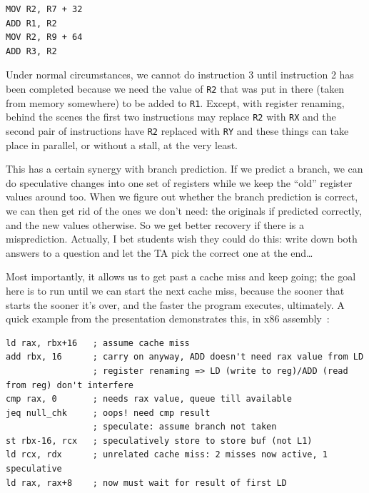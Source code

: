 \documentclass[a4paper]{report}
\begin{document}
\begin{verbatim}
MOV R2, R7 + 32
ADD R1, R2
MOV R2, R9 + 64
ADD R3, R2
\end{verbatim}

Under normal circumstances, we cannot do instruction 3 until instruction 2 has been completed because we need the value of \texttt{R2} that was put in there (taken from memory somewhere) to be added to \texttt{R1}. Except, with register renaming, behind the scenes the first two instructions may replace \texttt{R2} with \texttt{RX} and the second pair of instructions have \texttt{R2} replaced with \texttt{RY} and these things can take place in parallel, or without a stall, at the very least.

This has a certain synergy with branch prediction. If we predict a branch, we can do speculative changes into one set of registers while we keep the ``old'' register values around too. When we figure out whether the branch prediction is correct, we can then get rid of the ones we don't need: the originals if predicted correctly, and the new values otherwise. So we get better recovery if there is a misprediction. Actually, I bet students wish they could do this: write down both answers to a question and let the TA pick the correct one at the end\ldots

Most importantly, it allows us to get past a cache miss and keep going; the goal here is to run until we can start the next cache miss, because the sooner that starts the sooner it's over, and the faster the program executes, ultimately. A quick example from the presentation demonstrates this, in x86 assembly~\cite{modern-hardware}:

\begin{verbatim}
ld rax, rbx+16   ; assume cache miss
add rbx, 16      ; carry on anyway, ADD doesn't need rax value from LD
                 ; register renaming => LD (write to reg)/ADD (read from reg) don't interfere
cmp rax, 0       ; needs rax value, queue till available
jeq null_chk     ; oops! need cmp result
                 ; speculate: assume branch not taken
st rbx-16, rcx   ; speculatively store to store buf (not L1)
ld rcx, rdx      ; unrelated cache miss: 2 misses now active, 1 speculative
ld rax, rax+8    ; now must wait for result of first LD
\end{verbatim}
\end{document}

